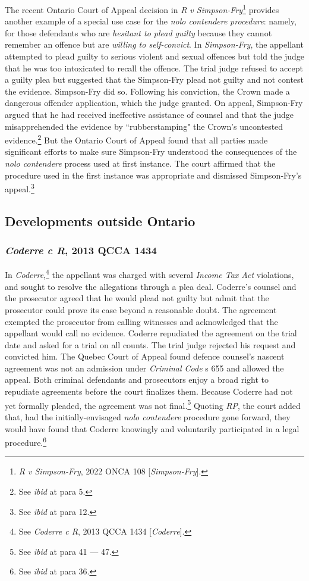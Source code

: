 The recent Ontario Court of Appeal decision in \textit{R v Simpson-Fry}\footnote{\textit{R v Simpson-Fry}, 2022 ONCA 108 [\textit{Simpson-Fry}].} provides another example of a special use case for the \textit{nolo contendere} \textit{procedure}: namely, for those defendants who are \textit{hesitant to plead guilty} because they cannot remember an offence but are \textit{willing to self-convict}. In \textit{Simpson-Fry}, the appellant attempted to plead guilty to serious violent and sexual offences but told the judge that he was too intoxicated to recall the offence. The trial judge refused to accept a guilty plea but suggested that the Simpson-Fry plead not guilty and not contest the evidence. Simpson-Fry did so. Following his conviction, the Crown made a dangerous offender application, which the judge granted. On appeal, Simpson-Fry argued that he had received ineffective assistance of counsel and that the judge misapprehended the evidence by ``rubberstamping" the Crown's uncontested evidence.\footnote{See \textit{ibid} at para 5.} But the Ontario Court of Appeal found that all parties made significant efforts to make sure Simpson-Fry understood the consequences of the \textit{nolo contendere} process used at first instance. The court affirmed that the procedure used in the first instance was appropriate and dismissed Simpson-Fry's appeal.\footnote{See \textit{ibid} at para 12.}

\subsection{Developments outside Ontario}
\subsubsection{\textit{Coderre c R}, 2013 QCCA 1434}
In \textit{Coderre},\footnote{See \textit{Coderre c R}, 2013 QCCA 1434 [\textit{Coderre}].} the appellant was charged with several \textit{Income Tax Act} violations, and sought to resolve the allegations through a plea deal. Coderre's counsel and the prosecutor agreed that he would plead not guilty but admit that the prosecutor could prove its case beyond a reasonable doubt. The agreement exempted the prosecutor from calling witnesses and acknowledged that the appellant would call no evidence. Coderre repudiated the agreement on the trial date and asked for a trial on all counts. The trial judge rejected his request and convicted him. The Quebec Court of Appeal found defence counsel's nascent agreement was not an admission under \textit{Criminal Code} s 655 and allowed the appeal. Both criminal defendants and prosecutors enjoy a broad right to repudiate agreements before the court finalizes them. Because Coderre had not yet formally pleaded, the agreement was not final.\footnote{See \textit{ibid} at para 41 — 47.} Quoting \textit{RP}, the court added that, had the initially-envisaged \textit{nolo contendere} procedure gone forward, they would have found that Coderre knowingly and voluntarily participated in a legal procedure.\footnote{See \textit{ibid} at para 36.}

